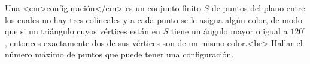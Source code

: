 Una <em>configuración</em> es un conjunto finito $S$ de puntos del plano entre los cuales no hay tres colineales y a cada punto se le asigna algún color, de modo que si un triángulo cuyos vértices están en $S$ tiene un ángulo mayor o igual a $120^{\circ}$, entonces exactamente dos de sus vértices son de un mismo color.<br>
Hallar el número máximo de puntos que puede tener una configuración.
